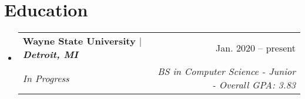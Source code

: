 \documentclass[letterpaper,11pt]{article}
\makeatletter
\newcommand{\resumeItem}[1]{
  \item\small{
    {#1 \vspace{-2pt}}
  }
}
\newcommand{\resumeSubheading}[4]{
  \vspace{-2pt}\item
    \begin{tabular*}{0.97\textwidth}[t]{l@{\extracolsep{\fill}}r}
      \textbf{#1} & #2 \\
      \textit{\small#3} & \textit{\small #4} \\
    \end{tabular*}\vspace{-7pt}
}
\newcommand{\resumeProjectHeading}[2]{
    \item
    \begin{tabular*}{0.97\textwidth}{l@{\extracolsep{\fill}}r}
      \small#1 & #2 \\
    \end{tabular*}\vspace{-7pt}
}
\newcommand{\resumeSubHeadingListStart}{\begin{itemize}[leftmargin=0.15in, label={}]}
\newcommand{\resumeSubHeadingListEnd}{\end{itemize}}
\newcommand{\resumeItemListStart}{\begin{itemize}}
\newcommand{\resumeItemListEnd}{\end{itemize}\vspace{-5pt}}
\makeatother
\begin{document}

\section{Education}
  \resumeSubHeadingListStart
    \resumeSubheading
    {\textbf{Wayne State University} $|$ \emph{Detroit, MI}}{Jan. 2020 -- present }
    {In Progress}{BS in Computer Science - Junior - Overall GPA: 3.83}
  \resumeSubHeadingListEnd
\vspace{1mm}
\end{document}
